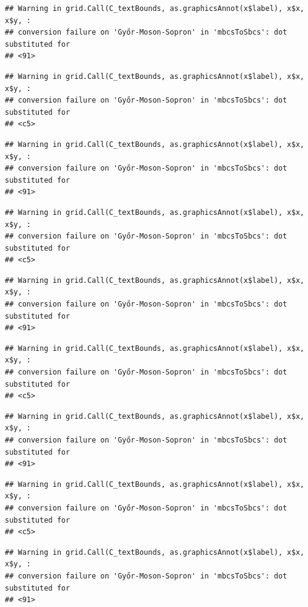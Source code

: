 \documentclass[
]{book}
\begin{document}
\begin{verbatim}
## Warning in grid.Call(C_textBounds, as.graphicsAnnot(x$label), x$x, x$y, :
## conversion failure on 'Győr-Moson-Sopron' in 'mbcsToSbcs': dot substituted for
## <91>
\end{verbatim}

\begin{verbatim}
## Warning in grid.Call(C_textBounds, as.graphicsAnnot(x$label), x$x, x$y, :
## conversion failure on 'Győr-Moson-Sopron' in 'mbcsToSbcs': dot substituted for
## <c5>
\end{verbatim}

\begin{verbatim}
## Warning in grid.Call(C_textBounds, as.graphicsAnnot(x$label), x$x, x$y, :
## conversion failure on 'Győr-Moson-Sopron' in 'mbcsToSbcs': dot substituted for
## <91>
\end{verbatim}

\begin{verbatim}
## Warning in grid.Call(C_textBounds, as.graphicsAnnot(x$label), x$x, x$y, :
## conversion failure on 'Győr-Moson-Sopron' in 'mbcsToSbcs': dot substituted for
## <c5>
\end{verbatim}

\begin{verbatim}
## Warning in grid.Call(C_textBounds, as.graphicsAnnot(x$label), x$x, x$y, :
## conversion failure on 'Győr-Moson-Sopron' in 'mbcsToSbcs': dot substituted for
## <91>
\end{verbatim}

\begin{verbatim}
## Warning in grid.Call(C_textBounds, as.graphicsAnnot(x$label), x$x, x$y, :
## conversion failure on 'Győr-Moson-Sopron' in 'mbcsToSbcs': dot substituted for
## <c5>
\end{verbatim}

\begin{verbatim}
## Warning in grid.Call(C_textBounds, as.graphicsAnnot(x$label), x$x, x$y, :
## conversion failure on 'Győr-Moson-Sopron' in 'mbcsToSbcs': dot substituted for
## <91>
\end{verbatim}

\begin{verbatim}
## Warning in grid.Call(C_textBounds, as.graphicsAnnot(x$label), x$x, x$y, :
## conversion failure on 'Győr-Moson-Sopron' in 'mbcsToSbcs': dot substituted for
## <c5>
\end{verbatim}

\begin{verbatim}
## Warning in grid.Call(C_textBounds, as.graphicsAnnot(x$label), x$x, x$y, :
## conversion failure on 'Győr-Moson-Sopron' in 'mbcsToSbcs': dot substituted for
## <91>
\end{verbatim}
\end{document}
